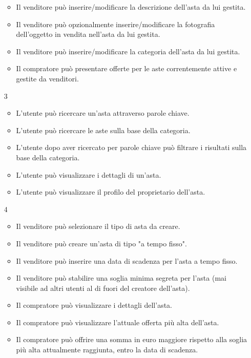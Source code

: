 \begin{itemize}
\begin{itemize}
                \item Il venditore può inserire/modificare la descrizione dell'asta da lui gestita.
                \item Il venditore può opzionalmente inserire/modificare la fotografia dell'oggetto in vendita nell'asta da lui gestita.
                \item Il venditore può inserire/modificare la categoria dell'asta da lui gestita.
                \item Il compratore può presentare offerte per le aste correntemente attive e gestite da venditori.
            \end{itemize} %
            \item[3]
            \begin{itemize} %
                \item L'utente può ricercare un'asta attraverso parole chiave.
                \item L'utente può ricercare le aste sulla base della categoria.
                \item L’utente dopo aver ricercato per parole chiave può filtrare i risultati sulla base della categoria.
                \item L'utente può visualizzare i dettagli di un'asta.
                \item L'utente può visualizzare il profilo del proprietario dell'asta.
            \end{itemize} %
            \item[4]
            \begin{itemize} %
                \item Il venditore può selezionare il tipo di asta da creare.
                \item Il venditore può creare un'asta di tipo "a tempo fisso".
                \item Il venditore può inserire una data di scadenza per l'asta a tempo fisso.
                \item Il venditore può stabilire una soglia minima segreta per l'asta (mai visibile ad altri utenti al di fuori del creatore dell'asta).
                \item Il compratore può visualizzare i dettagli dell'asta.
                \item Il compratore può visualizzare l'attuale offerta più alta dell'asta.
                \item Il compratore può offrire una somma in euro maggiore rispetto alla soglia più alta attualmente raggiunta, entro la data di scadenza.

\end{itemize}
\end{itemize}

